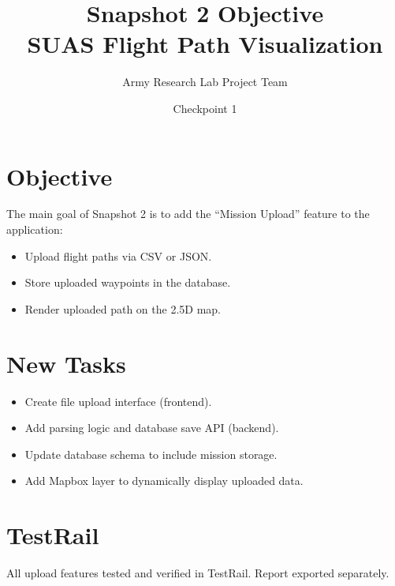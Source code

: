 \documentclass[12pt]{article}
\title{Snapshot 2 Objective\\SUAS Flight Path Visualization}
\author{Army Research Lab Project Team}
\date{Checkpoint 1}
\begin{document}
\maketitle

\section{Objective}
The main goal of Snapshot 2 is to add the “Mission Upload” feature to the application:
\begin{itemize}
  \item Upload flight paths via CSV or JSON.
  \item Store uploaded waypoints in the database.
  \item Render uploaded path on the 2.5D map.
\end{itemize}

\section{New Tasks}
\begin{itemize}
  \item Create file upload interface (frontend).
  \item Add parsing logic and database save API (backend).
  \item Update database schema to include mission storage.
  \item Add Mapbox layer to dynamically display uploaded data.
\end{itemize}

\section{TestRail}
All upload features tested and verified in TestRail. Report exported separately.
\end{document}
